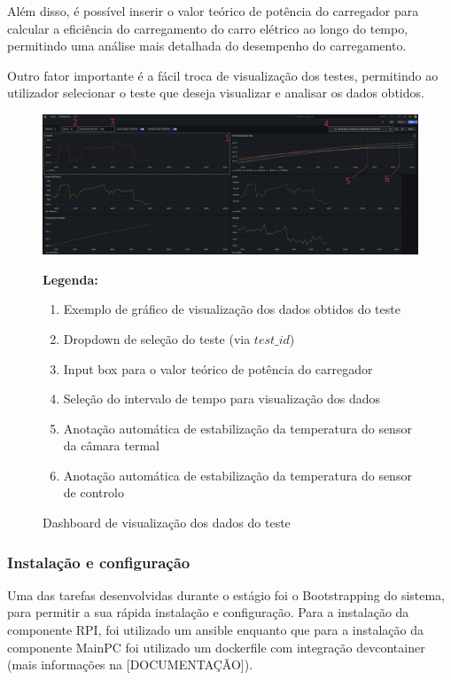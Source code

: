 Além disso, é possível inserir o valor teórico de potência do carregador para calcular a eficiência do carregamento do carro elétrico
ao longo do tempo, permitindo uma análise mais detalhada do desempenho do carregamento.

Outro fator importante é a fácil troca de visualização dos testes, permitindo ao utilizador selecionar o teste que deseja visualizar e analisar os dados obtidos. 

\begin{figure}[H]
    \centering
    \begin{minipage}{0.8\textwidth}
        \includegraphics[width=\linewidth]{figures/dashboard.png}
    \end{minipage}
    \caption{Dashboard de visualização dos dados do teste}
    \label{fig:dashboard}
    
    \vspace{0.5em}
    \begin{minipage}{0.95\textwidth}
        \small
        \textbf{Legenda:}
        \begin{enumerate}
            \item Exemplo de gráfico de visualização dos dados obtidos do teste
            \item Dropdown de seleção do teste (via $test\_id$)
            \item Input box para o valor teórico de potência do carregador
            \item Seleção do intervalo de tempo para visualização dos dados
            \item Anotação automática de estabilização da temperatura do sensor da câmara termal
            \item Anotação automática de estabilização da temperatura do sensor de controlo
        \end{enumerate}
    \end{minipage}
\end{figure}

\subsubsection{Instalação e configuração}
Uma das tarefas desenvolvidas durante o estágio foi o Bootstrapping do sistema, para
permitir a sua rápida instalação e configuração. Para a instalação da componente RPI, foi utilizado um ansible
enquanto que para a instalação da componente MainPC foi utilizado um dockerfile com integração devcontainer
(mais informações na [DOCUMENTAÇÃO]).


